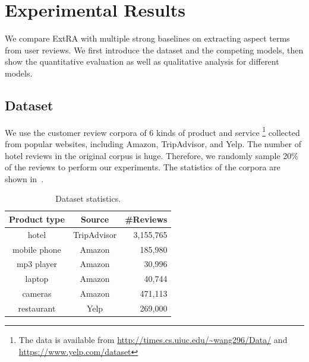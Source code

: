 \section{Experimental Results}
\label{sec:experiments}

We compare ExtRA with 
multiple strong baselines on extracting aspect terms from user reviews. 
We first introduce the dataset and the competing models, then
show the quantitative evaluation as well as qualitative analysis for
different models.

\subsection{Dataset}
\label{sec:dataset}
We use the customer review corpora of 6 kinds of product and service
\footnote{The data is available from
	\url{http://times.cs.uiuc.edu/~wang296/Data/} and 
	\url{https://www.yelp.com/dataset}} collected from popular websites, 
including Amazon, TripAdvisor, and Yelp. 
The number of hotel reviews \cite{Wang2011LearningOD} in the original
corpus is huge. 
Therefore, we randomly sample 20\% of the reviews to perform our experiments.
The statistics of the corpora are shown in~.

\begin{table}[th!]
	\small
	\centering
	\vspace{-0.3cm}
	\caption{Dataset statistics.} 
	\label{table:dataset}
	\vspace{-0.2cm}
	\begin{tabular}{|c|c|r|}
		\hline
		\textbf{Product type} & \textbf{Source} & \textbf{\#Reviews} \\ \hline \hline
		hotel        & TripAdvisor & 3,155,765   \\\hline
		mobile phone & Amazon & 185,980  \\\hline
		mp3 player   & Amazon & 30,996   \\\hline
		laptop       & Amazon & 40,744   \\\hline
		cameras & Amazon & 471,113  \\\hline
		restaurant   & Yelp & 269,000   \\\hline
	\end{tabular}
	\vspace{-0.2cm}
\end{table}

